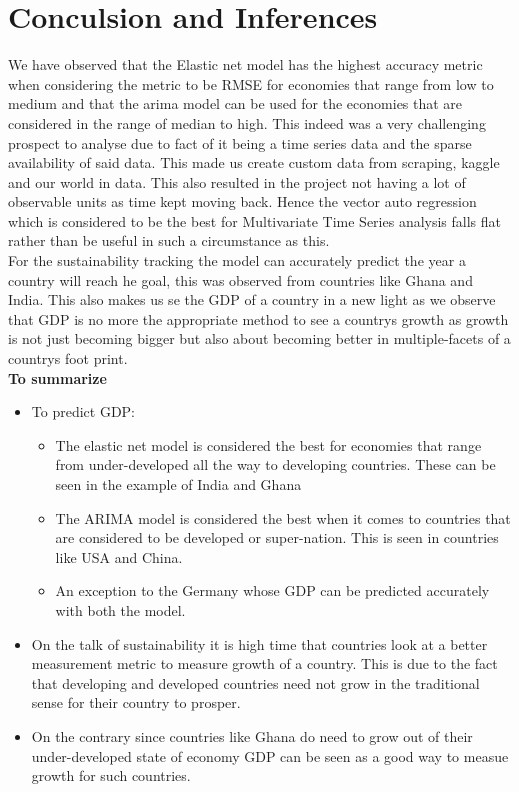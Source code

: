 \documentclass[conference]{IEEEtran}
\begin{document}
\section{Conculsion and Inferences}
We have observed that the Elastic net model has the highest accuracy metric when considering the metric to be RMSE for economies that range from low to medium and that the arima model can be used for the economies that are considered in the range of median to high.
This indeed was a very challenging prospect to analyse due to fact of it being a time series data and the sparse availability of said data.
This made us create custom data from scraping, kaggle and our world in data. This also resulted in the project not having a lot of observable units as time kept moving back. Hence
the vector auto regression which is considered to be the best for Multivariate Time Series analysis falls flat rather than be useful in such a circumstance as this.
\\
For the sustainability tracking the model can accurately predict the year a country will reach he goal, this was observed from countries like Ghana and India. This also makes us se the GDP of a country in a new light as
we observe that GDP is no more the appropriate method to see a countrys growth as growth is not just becoming bigger but also about becoming better in multiple-facets of a countrys foot print.
\\\textbf{To summarize}
\begin{itemize}
    \item To predict GDP:
          \begin{itemize}
              \item The elastic net model is considered the best for economies that range from under-developed all the way to developing countries. These can be seen in the example of India and Ghana
              \item The ARIMA model is considered the best when it comes to countries that are considered to be developed or super-nation. This is seen in countries like USA and China.
              \item An exception to the Germany whose GDP can be predicted accurately with both the model.
          \end{itemize}
    \item On the talk of sustainability it is high time that countries look at a better measurement metric to measure growth of a country. This is due to the fact that developing and developed countries need not grow in the traditional sense for their country to prosper.
    \item On the contrary since countries like Ghana do need to grow out of their under-developed state of economy GDP can be seen as a good way to measue growth for such countries.
\end{itemize}
\end{document}
